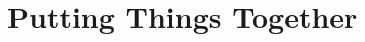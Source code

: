 \documentclass[11pt, a4paper]{article}
\begin{document}


\section{Putting Things Together}
\end{document}
